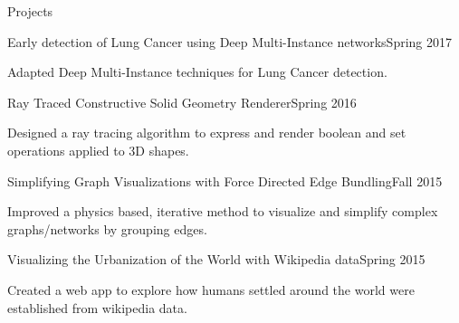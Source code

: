 \documentclass{resume}
\begin{document}
  \begin{rSection}{Projects}
    \begin{rSubsection}{Early detection of Lung Cancer using Deep Multi-Instance networks}{Spring 2017}
    {}{}
    \item Adapted Deep Multi-Instance techniques for Lung Cancer detection.
    \end{rSubsection}
    \begin{rSubsection}{Ray Traced Constructive Solid Geometry Renderer}{Spring 2016}{}{}
    \item Designed a ray tracing algorithm to express and render boolean and set operations applied to 3D shapes.
    \end{rSubsection}
    \begin{rSubsection}{Simplifying Graph Visualizations with Force Directed Edge Bundling}{Fall 2015}{}{}
    \item Improved a physics based, iterative method to visualize and simplify complex graphs/networks by grouping edges.
    \end{rSubsection}
    \begin{rSubsection}{Visualizing the Urbanization of the World with Wikipedia data}{Spring 2015}{}{}
    \item Created a web app to explore how humans settled around the world were established from wikipedia data.

\end{rSubsection}
\end{rSection}
\end{document}
